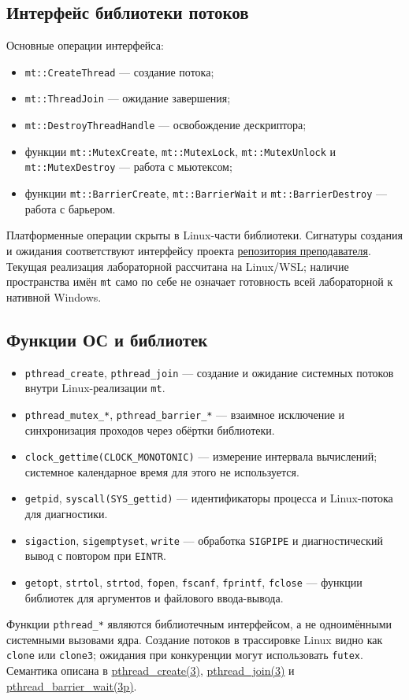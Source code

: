 \subsection{Интерфейс библиотеки потоков}
Основные операции интерфейса:
\begin{itemize}
\item \texttt{mt::CreateThread} --- создание потока;
\item \texttt{mt::ThreadJoin} --- ожидание завершения;
\item \texttt{mt::DestroyThreadHandle} --- освобождение дескриптора;
\item функции \texttt{mt::MutexCreate}, \texttt{mt::MutexLock}, \texttt{mt::MutexUnlock} и \texttt{mt::MutexDestroy} --- работа с мьютексом;
\item функции \texttt{mt::BarrierCreate}, \texttt{mt::BarrierWait} и \texttt{mt::BarrierDestroy} --- работа с барьером.
\end{itemize}
Платформенные операции скрыты в Linux-части библиотеки.
Сигнатуры создания и ожидания соответствуют интерфейсу проекта
\href{https://github.com/Yadroff/Operation-Systems}{репозитория преподавателя}.
Текущая реализация лабораторной рассчитана на Linux/WSL;
наличие пространства имён \texttt{mt} само по себе не означает
готовность всей лабораторной к нативной Windows.

\subsection{Функции ОС и библиотек}
\begin{itemize}
\item \texttt{pthread\_create}, \texttt{pthread\_join} --- создание и ожидание
системных потоков внутри Linux-реализации \texttt{mt}.
\item \texttt{pthread\_mutex\_*}, \texttt{pthread\_barrier\_*} --- взаимное
исключение и синхронизация проходов через обёртки библиотеки.
\item \texttt{clock\_gettime(CLOCK\_MONOTONIC)} --- измерение интервала
вычислений; системное календарное время для этого не используется.
\item \texttt{getpid}, \texttt{syscall(SYS\_gettid)} --- идентификаторы
процесса и Linux-потока для диагностики.
\item \texttt{sigaction}, \texttt{sigemptyset}, \texttt{write} --- обработка
\texttt{SIGPIPE} и диагностический вывод с повтором при \texttt{EINTR}.
\item \texttt{getopt}, \texttt{strtol}, \texttt{strtod},
\texttt{fopen}, \texttt{fscanf}, \texttt{fprintf}, \texttt{fclose} ---
функции библиотек для аргументов и файлового ввода-вывода.
\end{itemize}
Функции \texttt{pthread\_*} являются библиотечным интерфейсом, а не
одноимёнными системными вызовами ядра. Создание потоков в трассировке
Linux видно как \texttt{clone} или \texttt{clone3}; ожидания при конкуренции
могут использовать \texttt{futex}.
Семантика описана в
\href{https://man7.org/linux/man-pages/man3/pthread_create.3.html}{pthread\_create(3)},
\href{https://man7.org/linux/man-pages/man3/pthread_join.3.html}{pthread\_join(3)} и
\href{https://man7.org/linux/man-pages/man3/pthread_barrier_wait.3p.html}{pthread\_barrier\_wait(3p)}.

